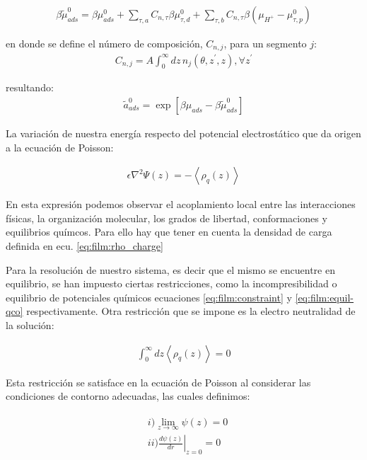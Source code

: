 \begin{align}
	\beta\tilde{\mu}^0_{ads} =  \beta \mu^0_{ads}  + \sum_{\tau,a} C_{n,\tau}\beta\mu^0_{\tau,d} 
	+ \sum_{\tau,b} C_{n,\tau}\beta(\mu_{H^+} - \mu^0_{\tau,p})
\end{align}

\noindent en donde se define el n\'umero de composici\'on, $C_{n,j}$, para un segmento $j$:
\begin{align}
	C_{n,j} = A\int_0^\infty dz \, n_j(\theta, z^\prime, z), \forall z^\prime
	\label{eq:film:n-coord}
\end{align}

 resultando:
\begin{align}
	\tilde{a}^0_{ads} = \exp[\beta\mu_{ads} - \beta\tilde{\mu}^0_{ads}]
	\label{eq:film:actividad-pro}
\end{align}

La variaci\'on de nuestra energ\'ia respecto del potencial electrost\'atico que da origen a la ecuaci\'on de Poisson:

\begin{align}
	\epsilon \nabla^2 \Psi(z) = - \left< \rho_q (z)\right>
\end{align}

En esta expresi\'on podemos observar  el acoplamiento local entre las interacciones f\'isicas, la organizaci\'on molecular, los grados de libertad, conformaciones y equilibrios qu\'imcos. Para ello hay que tener en cuenta la densidad de carga definida en ecu. \ref{eq:film:rho_charge} 

Para la resoluci\'on de nuestro sistema, es decir que el mismo  se encuentre en equilibrio, se han impuesto ciertas restricciones, como la incompresibilidad o equilibrio de potenciales qu\'imicos ecuaciones \ref{eq:film:constraint} y \ref{eq:film:equil-qco} respectivamente. Otra restricci\'on que se impone es la electro neutralidad de la soluci\'on: 

\begin{align}
	\int_0^\infty dz \left< \rho_q (z)\right> = 0
\end{align}

Esta restricci\'on se satisface en la ecuaci\'on de Poisson al considerar las condiciones de contorno adecuadas, las cuales definimos:

\begin{align}
	\begin{aligned}
		&i)  \lim_{z\to\infty}\psi(z) = 0 \\
		&ii) \left.\frac{d\psi(z)}{dr}\right|_{z=0} = 0
		\label{eq:film:contorno}
	\end{aligned}
\end{align}

